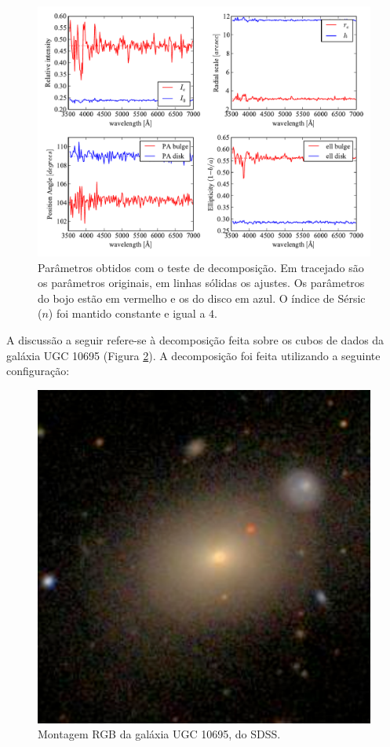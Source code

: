 \begin{figure}
	\includegraphics[width=1.0\columnwidth]{figuras/test-parameters}
	\caption[Parâmetros obtidos com o teste de decomposição] {Parâmetros obtidos
	com o teste de decomposição. Em tracejado são os parâmetros originais, em
	linhas sólidas os ajustes. Os parâmetros do bojo estão em vermelho e os do
	disco em azul. O índice de Sérsic ($n$) foi mantido constante e igual a $4$.}
	\label{fig:testParameters}
\end{figure}

A discussão a seguir refere-se à decomposição feita sobre os cubos de dados da
galáxia UGC 10695 (Figura \ref{fig:decompTarget}). A decomposição foi feita
utilizando a seguinte configuração:

\begin{figure}
	\includegraphics[width=0.3\columnwidth]{figuras/K0846}
	\caption[Montagem RGB da galáxia UGC 10695, do SDSS] {Montagem RGB da galáxia 
	UGC 10695, do SDSS.}
	\label{fig:decompTarget}
\end{figure}

